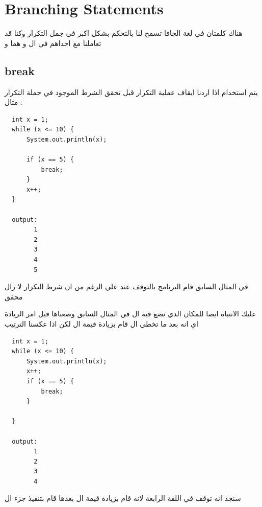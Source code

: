\section{Branching Statements}

\begin{AR}
  هناك كلمتان في لغة الجافا تسمح لنا بالتحكم بشكل اكبر في جمل التكرار وكنا قد تعاملنا مع احداهم في ال
   و هما
   و 
  
\end{AR}

\subsection{break}
\begin{AR}
  يتم استخدام  اذا اردنا ايقاف عملية التكرار قبل تحقق الشرط الموجود في جملة التكرار
  \\
  مثال :
\end{AR}
\begin{verbatim}
  int x = 1;  
  while (x <= 10) {
      System.out.println(x);
      
      if (x == 5) {
          break;
      }
      x++;
  }

  output: 
        1
        2
        3
        4
        5
\end{verbatim}
\begin{AR}
  في المثال السابق قام البرنامج بالتوقف عند  علي الرغم من ان شرط التكرار لا زال محقق
  \par
  عليك الانتباه ايضا للمكان الذي تضع فيه ال 
  في المثال السابق وضعناها قبل امر الزيادة اي انه بعد ما تخطي ال  قام بزيادة قيمة ال  لكن اذا عكسنا الترتيب
\end{AR}
\newpage
\begin{verbatim}
  int x = 1;  
  while (x <= 10) {
      System.out.println(x);
      x++;
      if (x == 5) {
          break;
      }
      
  }

  output: 
        1
        2
        3
        4
\end{verbatim}
\begin{AR}
  سنجد انه توقف في اللفة الرابعة لانه قام بزيادة قيمة ال 
  بعدها قام بتنفيذ جزء ال 
\end{AR}

